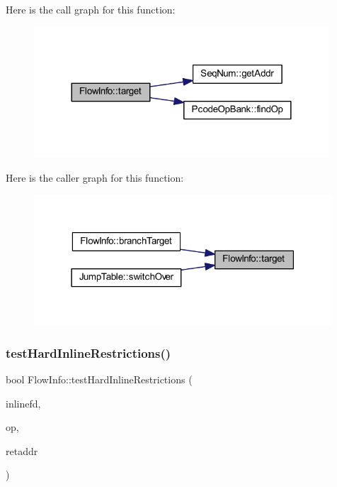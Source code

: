 Here is the call graph for this function\+:
\nopagebreak
\begin{figure}[H]
\begin{center}
\leavevmode
\includegraphics[width=312pt]{class_flow_info_a79b96fb0e47a98e97da11975f9fd5e0b_cgraph}
\end{center}
\end{figure}
Here is the caller graph for this function\+:
\nopagebreak
\begin{figure}[H]
\begin{center}
\leavevmode
\includegraphics[width=315pt]{class_flow_info_a79b96fb0e47a98e97da11975f9fd5e0b_icgraph}
\end{center}
\end{figure}
\mbox{\label{class_flow_info_a7ce3b6b33fb219117c69700e32b0c1ef}} 
\subsubsection{\texorpdfstring{testHardInlineRestrictions()}{testHardInlineRestrictions()}}
{\footnotesize\ttfamily bool Flow\+Info\+::test\+Hard\+Inline\+Restrictions (\begin{DoxyParamCaption}\item[{\mbox{\hyperlink{class_funcdata}{Funcdata}} $\ast$}]{inlinefd,  }\item[{\mbox{\hyperlink{class_pcode_op}{Pcode\+Op}} $\ast$}]{op,  }\item[{\mbox{\hyperlink{class_address}{Address}} \&}]{retaddr }\end{DoxyParamCaption})}



